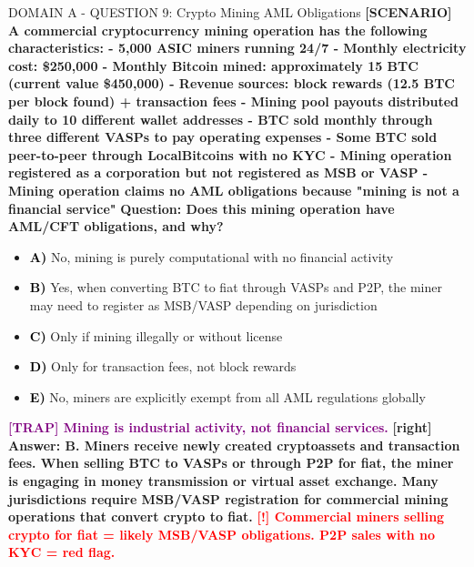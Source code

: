 \documentclass[11pt,a4paper]{beamer}
\newcommand{\redflag}[1]{\textcolor{red}{\textbf{[!] #1}}}
\newcommand{\trap}[1]{\textcolor{purple}{\textbf{[TRAP] #1}}}
\newcommand{\correct}[1]{\textcolor{green!50!black}{\textbf{[right] #1}}}
\newcommand{\scenario}[1]{\textcolor{blue!70!black}{\textbf{[SCENARIO] #1}}}
\newcommand{\option}[1]{\textcolor{black}{\textbf{#1}}}
\begin{document}
\begin{frame}{DOMAIN A - QUESTION 9: Crypto Mining AML Obligations}
\scenario{A commercial cryptocurrency mining operation has the following characteristics:
- 5,000 ASIC miners running 24/7
- Monthly electricity cost: \$250,000
- Monthly Bitcoin mined: approximately 15 BTC (current value \$450,000)
- Revenue sources: block rewards (12.5 BTC per block found) + transaction fees
- Mining pool payouts distributed daily to 10 different wallet addresses
- BTC sold monthly through three different VASPs to pay operating expenses
- Some BTC sold peer-to-peer through LocalBitcoins with no KYC
- Mining operation registered as a corporation but not registered as MSB or VASP
- Mining operation claims no AML obligations because "mining is not a financial service"}
\vspace{0.2cm}
\textbf{Question: Does this mining operation have AML/CFT obligations, and why?}
\vspace{0.1cm}
\begin{itemize}
    \item \option{A)} No, mining is purely computational with no financial activity
    \item \option{B)} Yes, when converting BTC to fiat through VASPs and P2P, the miner may need to register as MSB/VASP depending on jurisdiction
    \item \option{C)} Only if mining illegally or without license
    \item \option{D)} Only for transaction fees, not block rewards
    \item \option{E)} No, miners are explicitly exempt from all AML regulations globally
\end{itemize}
\vspace{0.2cm}
\trap{Mining is industrial activity, not financial services.}
\correct{Answer: B. Miners receive newly created cryptoassets and transaction fees. When selling BTC to VASPs or through P2P for fiat, the miner is engaging in money transmission or virtual asset exchange. Many jurisdictions require MSB/VASP registration for commercial mining operations that convert crypto to fiat.}
\redflag{Commercial miners selling crypto for fiat = likely MSB/VASP obligations. P2P sales with no KYC = red flag.}
\end{frame}
\end{document}
